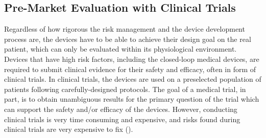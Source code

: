 %
%
%

\subsection{Pre-Market Evaluation with Clinical Trials}
Regardless of how rigorous the risk management and the device development process are, the devices have to be able to achieve their design goal on the real patient, which can only be evaluated within its physiological environment. Devices that have high risk factors, including the closed-loop medical devices, are required to submit clinical evidence for their safety and efficacy, often in form of clinical trials. In clinical trials, the devices are used on a preselected population of patients following carefully-designed protocols. The goal of a medical trial, in part, is  to obtain unambiguous results for the primary question of the trial which can support the safety and/or efficacy of the devices. However, conducting clinical trials is very time consuming and expensive, and risks found during clinical trials are very expensive to fix (\cite{trialcost}). 

